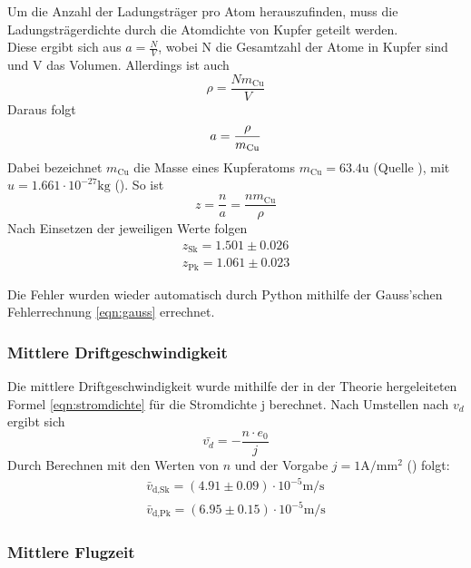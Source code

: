 Um die Anzahl der Ladungsträger pro Atom herauszufinden, muss die Ladungsträgerdichte durch 
die Atomdichte von Kupfer geteilt werden.\\
Diese ergibt sich aus $a = \frac{N}{V}$, wobei N die Gesamtzahl der Atome in Kupfer sind und V das Volumen. 
Allerdings ist auch 
\begin{equation*}
\rho = \frac{N m_\text{Cu}}{V}
\end{equation*}
Daraus folgt
\begin{equation*}
a = \frac{\rho}{m_\text{Cu}} \\
\end{equation*}
Dabei bezeichnet $m_\text{Cu}$ die Masse eines Kupferatoms $m_\text{Cu} = 63.4 \si{\atomicmassunit}$ (Quelle \cite{beweglichkeit}), mit $u = 1.661 \cdot 10^{-27}\si{\kilo\g}$ (\cite{beweglichkeit}).
So ist
\begin{equation}
z = \frac{n}{a} = \frac{n m_\text{Cu}}{\rho}
\end{equation}
Nach Einsetzen der jeweiligen Werte folgen
\begin{align*}
z_\text{Sk} = 1.501 \pm 0.026\\
z_\text{Pk} = 1.061 \pm 0.023
\end{align*}

Die Fehler wurden wieder automatisch durch Python mithilfe der Gauss'schen Fehlerrechnung 
\eqref{eqn:gauss} errechnet.

\subsubsection{Mittlere Driftgeschwindigkeit}

Die mittlere Driftgeschwindigkeit wurde mithilfe der in der Theorie hergeleiteten
Formel \eqref{eqn:stromdichte} für die Stromdichte j  berechnet. Nach Umstellen nach $v_d$ ergibt sich
\begin{equation*}
\bar{v_d} = - \frac{n \cdot e_0}{j} 
\end{equation*}
Durch Berechnen mit den Werten von $n$ und der Vorgabe $j = 1 \si{\ampere\per\milli\meter\squared}$ (\cite{V311})
folgt:
\begin{align*}
\bar{v}_\text{d,Sk} = \left( 4.91 \pm 0.09 \right) \cdot 10^{-5} \si{\m\per\s}\\
\bar{v}_\text{d,Pk} = \left( 6.95 \pm 0.15 \right) \cdot 10^{-5} \si{\m\per\s}
\end{align*}

\subsubsection{Mittlere Flugzeit}

